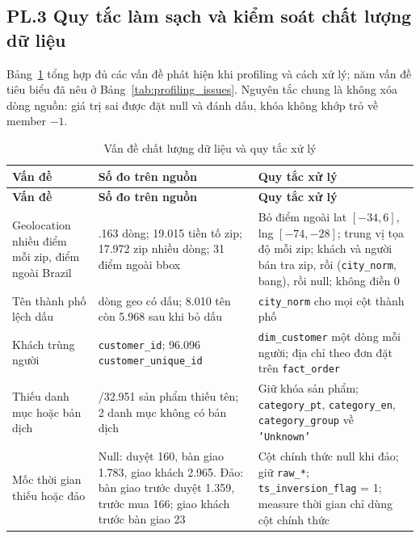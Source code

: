 \documentclass[a4paper]{article}
\begin{document}
\label{pl:3}
\subsection*{PL.3 Quy tắc làm sạch và kiểm soát chất lượng dữ liệu}

Bảng~\ref{tab:pl_clean} tổng hợp đủ các vấn đề phát hiện khi profiling và cách xử lý; năm vấn đề tiêu biểu đã nêu ở Bảng~\ref{tab:profiling_issues}. Nguyên tắc chung là không xóa dòng nguồn: giá trị sai được đặt null và đánh dấu, khóa không khớp trỏ về member $-1$.

{\footnotesize
\setlength{\tabcolsep}{3pt}
\renewcommand{\arraystretch}{1.12}
\begin{longtable}{@{}>{\raggedright\arraybackslash}p{3.3cm}>{\raggedright\arraybackslash}p{4.5cm}>{\raggedright\arraybackslash}p{8.2cm}@{}}
\caption{Vấn đề chất lượng dữ liệu và quy tắc xử lý}\label{tab:pl_clean}\\
\toprule
\textbf{Vấn đề} & \textbf{Số đo trên nguồn} & \textbf{Quy tắc xử lý} \\
\midrule
\endfirsthead
\toprule
\textbf{Vấn đề} & \textbf{Số đo trên nguồn} & \textbf{Quy tắc xử lý} \\
\midrule
\endhead
\bottomrule
\endfoot
Geolocation nhiều điểm mỗi zip, điểm ngoài Brazil & 1.000.163 dòng; 19.015 tiền tố zip; 17.972 zip nhiều dòng; 31 điểm ngoài bbox & Bỏ điểm ngoài lat $[-34, 6]$, lng $[-74, -28]$; trung vị tọa độ mỗi zip; khách và người bán tra zip, rồi (\texttt{city\_\allowbreak{}norm}, bang), rồi null; không điền 0 \\
\addlinespace
Tên thành phố lệch dấu & 73.437 dòng geo có dấu; 8.010 tên còn 5.968 sau khi bỏ dấu & \texttt{city\_\allowbreak{}norm} cho mọi cột thành phố \\
\addlinespace
Khách trùng người & 99.441 \texttt{customer\_\allowbreak{}id}; 96.096 \texttt{customer\_\allowbreak{}unique\_\allowbreak{}id} & \texttt{dim\_\allowbreak{}customer} một dòng mỗi người; địa chỉ theo đơn đặt trên \texttt{fact\_\allowbreak{}order} \\
\addlinespace
Thiếu danh mục hoặc bản dịch & 610/32.951 sản phẩm thiếu tên; 2 danh mục không có bản dịch & Giữ khóa sản phẩm; \texttt{category\_\allowbreak{}pt}, \texttt{category\_\allowbreak{}en}, \texttt{category\_\allowbreak{}group} về \texttt{'Unknown'} \\
\addlinespace
Mốc thời gian thiếu hoặc đảo & Null: duyệt 160, bàn giao 1.783, giao khách 2.965. Đảo: bàn giao trước duyệt 1.359, trước mua 166; giao khách trước bàn giao 23 & Cột chính thức null khi đảo; giữ \texttt{raw\_\allowbreak{}*}; \texttt{ts\_\allowbreak{}inversion\_\allowbreak{}flag} = 1; measure thời gian chỉ dùng cột chính thức \\

\end{longtable}}
\end{document}
